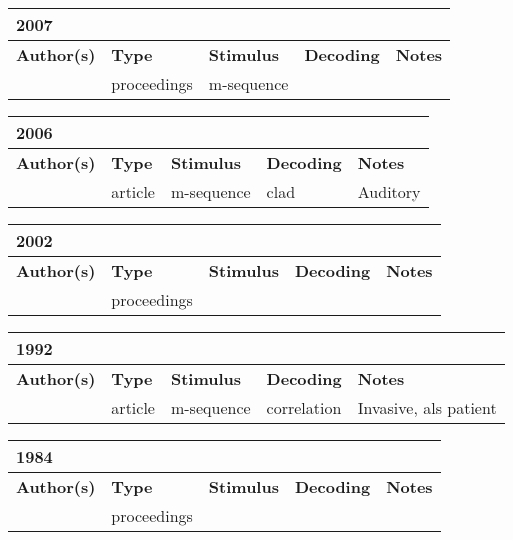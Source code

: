 \documentclass[a4paper,landscape]{article}
\begin{document}
\begin{table}[H]
	\begin{tabular}{p{5cm}p{2cm}p{5cm}p{5cm}p{6.5cm}}
		\textbf{2007} & & & & \\
		\toprule
		\textbf{Author(s)} & \textbf{Type} & \textbf{Stimulus} & \textbf{Decoding} & \textbf{Notes} \\
		\midrule
		\citeauthor{momose2007}  & proceedings & m-sequence & & \\
		\bottomrule
	\end{tabular}
\end{table}

\begin{table}[H]
	\begin{tabular}{p{5cm}p{2cm}p{5cm}p{5cm}p{6.5cm}}
		\textbf{2006} & & & & \\
		\toprule
		\textbf{Author(s)} & \textbf{Type} & \textbf{Stimulus} & \textbf{Decoding} & \textbf{Notes} \\
		\midrule
		\citeauthor{bohorquez2006}  & article & m-sequence & \acrshort{clad} & Auditory \\
		\bottomrule
	\end{tabular}
\end{table}

\begin{table}[H]
	\begin{tabular}{p{5cm}p{2cm}p{5cm}p{5cm}p{6.5cm}}
		\textbf{2002} & & & & \\
		\toprule
		\textbf{Author(s)} & \textbf{Type} & \textbf{Stimulus} & \textbf{Decoding} & \textbf{Notes} \\
		\midrule
		\citeauthor{hanagata2002} & proceedings & & & \\
		\bottomrule
\end{tabular}
\end{table}

\begin{table}[H]
	\begin{tabular}{p{5cm}p{2cm}p{5cm}p{5cm}p{6.5cm}}
		\textbf{1992} & & & & \\
		\toprule
		\textbf{Author(s)} & \textbf{Type} & \textbf{Stimulus} & \textbf{Decoding} & \textbf{Notes} \\
		\midrule
		\citeauthor{sutter1992} & article & m-sequence & correlation & Invasive, \acrshort{als} patient \\
		\bottomrule
	\end{tabular}
\end{table}

\begin{table}[H]
	\begin{tabular}{p{5cm}p{2cm}p{5cm}p{5cm}p{6.5cm}}
		\textbf{1984} & & & & \\
		\toprule
		\textbf{Author(s)} & \textbf{Type} & \textbf{Stimulus} & \textbf{Decoding} & \textbf{Notes} \\
		\midrule
		\citeauthor{sutter1984} & proceedings & & & \\
		\bottomrule
	\end{tabular}
\end{table}

\clearpage



\clearpage
\printglossary
	
\end{document}
